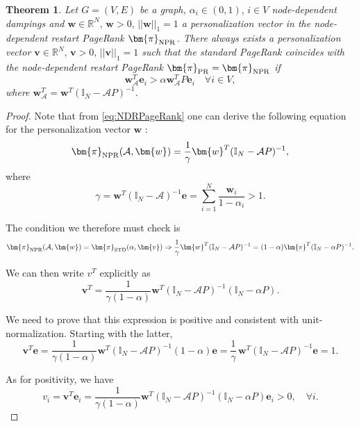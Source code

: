 \documentclass[sn-mathphys-ay]{sn-jnl}%
\newcommand{\R}{\mathbb{R}}
\newcommand{\I}{\mathbb{I}}
\newcommand{\bv}{\bm{v}}
\newcommand{\bw}{\bm{w}}
\newcommand{\be}{\mathbf{e}}
\newcommand{\cA}{\mathcal{A}}
\theoremstyle{thmstyleone}%
\newtheorem{theorem}{Theorem}%
\theoremstyle{thmstyletwo}%
\theoremstyle{thmstylethree}%
\begin{document}
\begin{theorem}
	Let $G=(V,E)$ be a graph, $\alpha_i\in(0,1),\, i\in V$ node-dependent dampings and $\bm{w}\in \mathbb{R}^N,\, \bm{w}>0,\,||\bm{w}||_1=1$ a personalization vector in the node-dependent restart PageRank $\bm{\pi}_{\rm NPR}$. There always exists a personalization vector $\bv\in\R^N,\,\bv>0,\,||\bv||_1=1$ such that the standard PageRank coincides with the node-dependent restart PageRank $\bm{\pi}_{\rm PR}=\bm{\pi}_{\rm NPR}$ if 
	\begin{equation}
		\bw_\cA^T \be_i > \alpha \bw_\cA^T P \be_i \quad  \forall i\in V,
	\end{equation}
	where $\bw_\cA^T=\bw^T(\I_N-\cA P)^{-1}$.    
\end{theorem}

\begin{proof}
	Note that from \eqref{eq:NDRPageRank} one can derive the following equation for the personalization vector $\bm{w}$ \cite{avrachenkov2014personalized}:
	\begin{equation}\label{eq:boldi-dampinig_vector}
		\bm{\pi}_{\rm NPR}(\cA,\bw) = \frac{1}{\gamma} \bw^T(\I_N - \cA P)^{-1},
	\end{equation}
	where
	\begin{equation}\label{eq:gamma_NDPR}
		\gamma = \bw^T(\I_N - \cA)^{-1}\be = \sum_{i=1}^N \frac{\bw_i}{1-\alpha_i}>1.
	\end{equation}
	
	The condition we therefore must check is 
	\begin{equation}
		\bm{\pi}_{\rm NPR}(\cA,\bw) = \bm{\pi}_{\rm STD}(\alpha,\bv) \Rightarrow \frac{1}{\gamma} \bw^T(\I_N - \cA P)^{-1} = (1-\alpha) \bv^T (\I_N - \alpha P)^{-1}. 
	\end{equation}
	
	We can then write $v^T$ explicitly as
	\begin{equation}
		\bv^T= \frac{1}{\gamma(1-\alpha)} \bw^T(\I_N-\cA P)^{-1} (\I_N - \alpha P).
	\end{equation}
	
	We need to prove that this expression is positive and consistent with unit-normalization. Starting with the latter,
	\begin{equation}
		\bv^T \be =\frac{1}{\gamma(1-\alpha)} \bw^T (\I_N-\cA P)^{-1} (1 - \alpha ) \be = \frac{1}{\gamma}\,\bw^T (\I_N-\cA P)^{-1} \be = 1.
	\end{equation}
	
	As for positivity,  we have
	\begin{equation}
		v_i = \bv^T \be_i = \frac{1}{\gamma(1-\alpha)} \bw^T(\I_N-\cA P)^{-1} (\I_N - \alpha P) \be_i > 0,\quad \forall i.
	\end{equation}
	

\end{proof}
\end{document}
